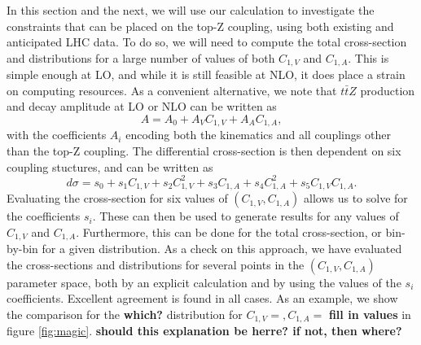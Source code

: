 \documentclass[preprint]{JHEP3} %
\def\ttbZ{t\bar{t}Z}
\begin{document}
In this section and the next, we will use our calculation to investigate the constraints that can be placed on the top-Z coupling, using both existing and anticipated LHC data. 
To do so, we will need to compute the total cross-section and distributions for a large number of values of both $C_{1,V}$ and $C_{1,A}$. 
This is simple enough at LO, and while it is still feasible at NLO, it does place a strain on computing resources. 
As a convenient alternative, we note that $\ttbZ$ production and decay amplitude at LO or NLO can be written as
\begin{equation}
  A = A_0 + A_V C_{1,V} + A_A C_{1,A},
\end{equation}
with the coefficients $A_i$ encoding both the kinematics and all couplings other than the top-Z coupling. 
The differential cross-section is then dependent on six coupling stuctures, and can be written as
\begin{equation}
\label{eq:couplfit}
  d\sigma = s_0 +s_1C_{1,V} + s_2C_{1,V}^2 +s_3 C_{1,A}+s_4C_{1,A}^2+s_5C_{1,V}C_{1,A}.
\end{equation}
Evaluating the cross-section for six values of $(C_{1,V},C_{1,A})$ allows us to solve for the coefficients $s_i$. 
These can then be used to generate results for any values of $C_{1,V}$ and $C_{1,A}$. 
Furthermore, this can be done for the total cross-section, or bin-by-bin for a given distribution. 
As a check on this approach, we have evaluated the cross-sections and distributions for several points in the $(C_{1,V},C_{1,A})$ parameter space, 
both by an explicit calculation and by using the values of the $s_i$ coefficients. Excellent agreement is found in all cases. 
As an example, we show the comparison for the {\bf which?} distribution for $C_{1,V}=, C_{1,A}=$ {\bf fill in values} in figure \ref{fig:magic}. 
{\bf should this explanation be herre? if not, then where?}
\end{document}
